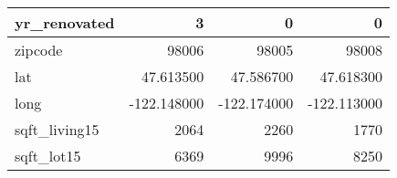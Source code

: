 \begin{table}[H]
\begin{tabular}{|l|r|r|r|}
\hline yr\_renovated & \cellcolor[rgb]{0.9, 0.54, 0.52} 3 & 0 & 0 \\
\hline zipcode & \cellcolor[rgb]{0.9, 0.54, 0.52} 98006 & 98005 & 98008 \\
\hline lat & \cellcolor[rgb]{0.9, 0.54, 0.52} 47.613500 & 47.586700 & 47.618300 \\
\hline long & \cellcolor[rgb]{0.9, 0.54, 0.52} -122.148000 & \cellcolor[rgb]{0.9, 0.54, 0.52} -122.174000 & \cellcolor[rgb]{0.9, 0.54, 0.52} -122.113000 \\
\hline sqft\_living15 & \cellcolor[rgb]{0.9, 0.54, 0.52} 2064 & 2260 & 1770 \\
\hline sqft\_lot15 & \cellcolor[rgb]{0.9, 0.54, 0.52} 6369 & 9996 & 8250 \\
\hline
\end{tabular}
\end{table}
